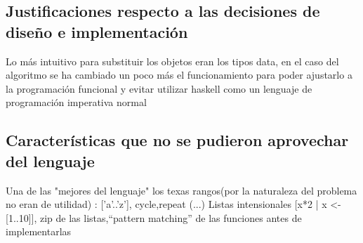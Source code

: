 \documentclass[12pt,a4paper]{article}
\begin{document}
       \subsection{Justificaciones respecto a las decisiones de diseño e implementación}
       Lo más intuitivo para substituir los objetos eran los tipos data, en el caso del algoritmo se ha cambiado un poco más el funcionamiento para poder ajustarlo a la programación funcional y evitar utilizar haskell como un lenguaje de programación imperativa normal
       \subsection{Características que no se pudieron aprovechar del lenguaje}
       Una de las "mejores del lenguaje" los texas rangos(por la naturaleza del problema no eran de utilidad) : ['a'..'z'], cycle,repeat (...) Listas intensionales [x*2 | x <- [1..10]], zip de las listas,“pattern matching” de las funciones antes de implementarlas
       
\end{document}
